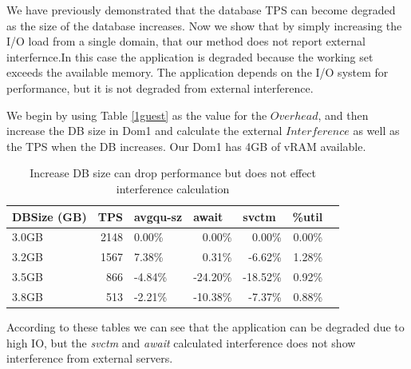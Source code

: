 We have previously demonstrated that the database TPS can become degraded as the size of the database increases.  Now we show that by simply increasing the I/O load from a single domain, that our method does not report external interfernce.In this case the application is degraded because the working set exceeds the available memory.  The application depends on the I/O system for performance, but it is not degraded from external interference.

We begin by using Table \ref{1guest} as the value for the $Overhead$, and then increase the DB size in Dom1 and calculate the external $Interference$ as well as the TPS when the DB increases.  Our Dom1 has 4GB of vRAM available.

\begin{table}[htbp]
\begin{tabular}{|l|r|l|r|r|r|r|}
\hline
DBSize (GB) & \multicolumn{1}{l|}{TPS} & \multicolumn{1}{l|}{avgqu-sz} & \multicolumn{1}{l|}{await} & \multicolumn{1}{l|}{svctm} & \multicolumn{1}{l|}{\%util} \\ \hline
3.0GB & 2148 & 0.00\% & 0.00\% & 0.00\% & 0.00\% \\ \hline
3.2GB & 1567 & 7.38\% & 0.31\% & -6.62\% & 1.28\% \\ \hline
3.5GB  & 866 & -4.84\% & -24.20\% & -18.52\% & 0.92\% \\ \hline
3.8GB & 513 & -2.21\% & -10.38\% & -7.37\% & 0.88\% \\ \hline
\end{tabular}
\caption{Increase DB size can drop performance but does not effect interference calculation}
\label{DBsize}
\end{table}

According to these tables we can see that the application can be degraded due to high IO, but the \emph{svctm} and \emph{await} calculated interference does not show interference from external servers.
